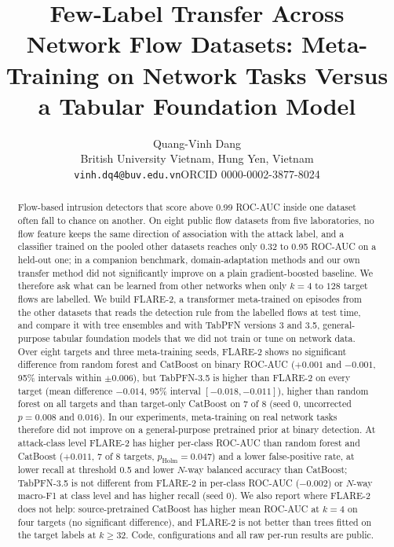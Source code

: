 \documentclass[11pt]{article}
\title{Few-Label Transfer Across Network Flow Datasets: Meta-Training on Network Tasks Versus a Tabular Foundation Model}
\author{Quang-Vinh Dang\\
British University Vietnam, Hung Yen, Vietnam\\
\texttt{vinh.dq4@buv.edu.vn}\quad ORCID 0000-0002-3877-8024}
\date{}
\begin{document}
\maketitle

\begin{abstract}
Flow-based intrusion detectors that score above 0.99 ROC-AUC inside one dataset often fall to chance on another.
On eight public flow datasets from five laboratories, no flow feature keeps the same direction of association with the attack label, and a classifier trained on the pooled other datasets reaches only 0.32 to 0.95 ROC-AUC on a held-out one; in a companion benchmark, domain-adaptation methods and our own transfer method did not significantly improve on a plain gradient-boosted baseline.
We therefore ask what can be learned from other networks when only $k=4$ to $128$ target flows are labelled.
We build FLARE-2, a transformer meta-trained on episodes from the other datasets that reads the detection rule from the labelled flows at test time, and compare it with tree ensembles and with TabPFN versions 3 and 3.5, general-purpose tabular foundation models that we did not train or tune on network data.
Over eight targets and three meta-training seeds, FLARE-2 shows no significant difference from random forest and CatBoost on binary ROC-AUC ($+0.001$ and $-0.001$, 95\% intervals within $\pm0.006$), but TabPFN-3.5 is higher than FLARE-2 on every target (mean difference $-0.014$, 95\% interval $[-0.018,-0.011]$), higher than random forest on all targets and than target-only CatBoost on 7 of 8 (seed 0, uncorrected $p=0.008$ and $0.016$).
In our experiments, meta-training on real network tasks therefore did not improve on a general-purpose pretrained prior at binary detection.
At attack-class level FLARE-2 has higher per-class ROC-AUC than random forest and CatBoost ($+0.011$, 7 of 8 targets, $p_{\text{Holm}}=0.047$) and a lower false-positive rate, at lower recall at threshold 0.5 and lower $N$-way balanced accuracy than CatBoost; TabPFN-3.5 is not different from FLARE-2 in per-class ROC-AUC ($-0.002$) or $N$-way macro-F1 at class level and has higher recall (seed 0).
We also report where FLARE-2 does not help: source-pretrained CatBoost has higher mean ROC-AUC at $k=4$ on four targets (no significant difference), and FLARE-2 is not better than trees fitted on the target labels at $k\ge32$.
Code, configurations and all raw per-run results are public.
\end{abstract}
\end{document}
